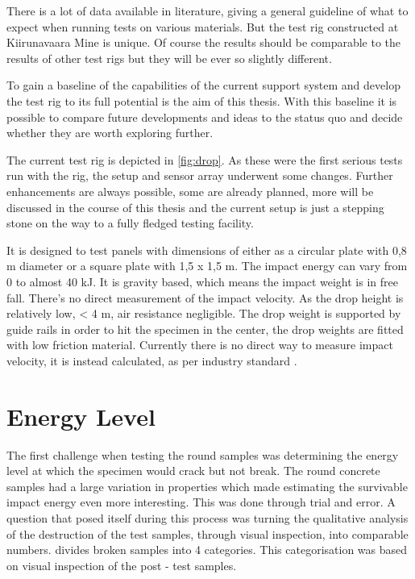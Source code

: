 There is a lot of data available in literature, giving a general guideline of what to expect when running tests on various materials. But the test rig constructed at Kiirunavaara Mine is unique. Of course the results should be comparable to the results of other test rigs but they will be ever so slightly different.

To gain a baseline of the capabilities of the current support system and develop the test rig to its full potential is the aim of this thesis. With this baseline it is possible to compare future developments and ideas to the status quo and decide whether they are worth exploring further.  

The current test rig is depicted in \autoref{fig:drop}. As these were the first serious tests run with the rig, the setup and sensor array underwent some changes. Further enhancements are always possible, some are already planned, more will be discussed in the course of this thesis and the current setup is just a stepping stone on the way to a fully fledged testing facility. 

It is designed to test panels with dimensions of either as a circular plate with 0,8 m diameter or a square plate with 1,5 x 1,5 m. The impact energy can vary from 0 to almost 40 kJ. It is gravity based, which means the impact weight is in free fall. There's no direct measurement of the impact velocity. As the drop height is relatively low, < 4 m, air resistance negligible. The drop weight is supported by guide rails in order to hit the specimen in the center, the drop weights are fitted with low friction material. Currently there is no direct way to measure impact velocity, it is instead calculated, as per industry standard \autocite[13]{Crompton18}. %

\section{Energy Level}

The first challenge when testing the round samples was determining the energy level at which the specimen would crack but not break. The round concrete samples had a large variation in properties which made estimating the survivable impact energy even more interesting. %
This was done through trial and error. A question that posed itself during this process was turning the qualitative analysis of the destruction of the test samples, through visual inspection, into comparable numbers. 
\Textcite{canada96} divides broken samples into 4 categories. This categorisation was based on visual inspection of the post - test samples.

